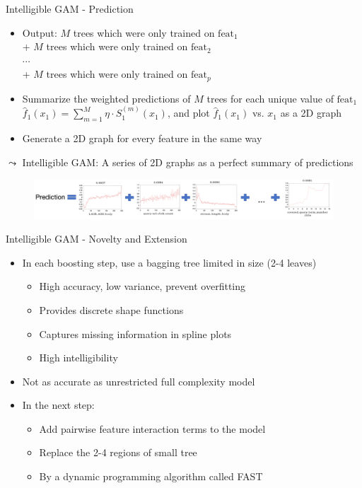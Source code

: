 \documentclass[11pt,compress,t,notes=noshow, aspectratio=169, xcolor=table]{beamer}
\begin{document}
\begin{frame}{Intelligible GAM - Prediction}
\begin{itemize}
    \item Output: $M$ trees which were only trained on $\text{feat}_1$ \\
    \qquad\;\; + $M$ trees which were only trained on $\text{feat}_2$ \\
    \qquad\;\; $\cdots$ \\
    \qquad\;\; + $M$ trees which were only trained on $\text{feat}_p$
    \item Summarize the weighted predictions of $M$ trees for each unique value of $\text{feat}_1$ $\hat{f}_1(x_1)=\sum_{m=1}^{M}\eta\cdot S_1^{(m)}(x_1)$, and plot $\hat{f}_1(x_1)$ vs. $x_1$ as a 2D graph
    \item Generate a 2D graph for every feature in the same way
\end{itemize}
\quad $\leadsto$ Intelligible GAM: A series of 2D graphs as a perfect summary of predictions
\begin{figure}
    \centering
    \includegraphics[width=1.3\linewidth]{figure/ebm_prediction.png}
    \label{fig:Intelligible ebm_prediction}
\end{figure}
\end{frame}

\begin{frame}{Intelligible GAM - Novelty and Extension}
\begin{itemize}
    \item In each boosting step, use a bagging tree limited in size (2-4 leaves) \begin{itemize}
        \item High accuracy, low variance, prevent overfitting
        \item Provides discrete shape functions
        \item Captures missing information in spline plots
        \item High intelligibility
    \end{itemize}
    \item Not as accurate as unrestricted full complexity model
    \item In the next step: 
    \begin{itemize}
        \item Add pairwise feature interaction terms to the model
        \item Replace the 2-4 regions of small tree
        \item By a dynamic programming algorithm called FAST
    \end{itemize}
\end{itemize}
\end{frame}
\end{document}
